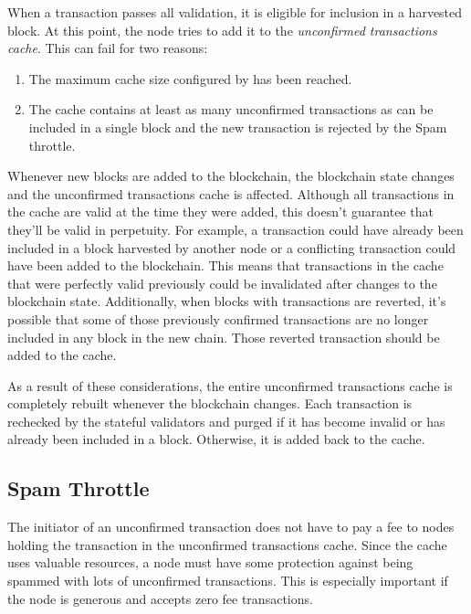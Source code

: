 When a transaction passes all validation, it is eligible for inclusion in a harvested block.
At this point, the node tries to add it to the \textit{unconfirmed transactions cache}.
This can fail for two reasons:
\begin{enumerate}
	\item{The maximum cache size configured by  has been reached.}
	\item{The cache contains at least as many unconfirmed transactions as can be included in a single block and the new transaction is rejected by the Spam throttle}.
\end{enumerate}

Whenever new blocks are added to the blockchain, the blockchain state changes and the unconfirmed transactions cache is affected.
Although all transactions in the cache are valid at the time they were added, this doesn't guarantee that they'll be valid in perpetuity.
For example, a transaction could have already been included in a block harvested by another node or a conflicting transaction could have been added to the blockchain.
This means that transactions in the cache that were perfectly valid previously could be invalidated after changes to the blockchain state.
Additionally, when blocks with transactions are reverted, it's possible that some of those previously confirmed transactions are no longer included in any block in the new chain.
Those reverted transaction should be added to the cache.

As a result of these considerations, the entire unconfirmed transactions cache is completely rebuilt whenever the blockchain changes.
Each transaction is rechecked by the stateful validators and purged if it has become invalid or has already been included in a block.
Otherwise, it is added back to the cache.

\subsection{Spam Throttle}

The initiator of an unconfirmed transaction does not have to pay a fee to nodes holding the transaction in the unconfirmed transactions cache.
Since the cache uses valuable resources, a node must have some protection against being spammed with lots of unconfirmed transactions.
This is especially important if the node is generous and accepts zero fee transactions.


